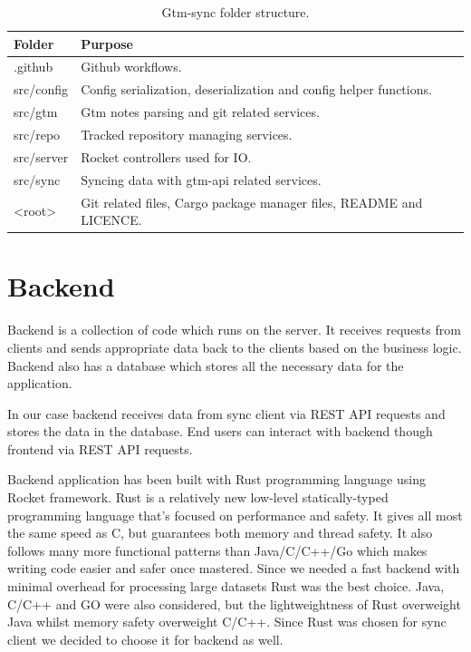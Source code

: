 \begin{table}[h]
    \centering
    \begin{tabular}{ | p{3cm} | p{10cm} |}
        \hline
        Folder & Purpose\\
        \hline
        .github & Github workflows.\\
        \hline
        src/config & Config serialization, deserialization and config helper functions.\\
        \hline
        src/gtm & Gtm notes parsing and git related services.\\
        \hline
        src/repo & Tracked repository managing services.\\
        \hline
        src/server & Rocket controllers used for IO.\\
        \hline
        src/sync & Syncing data with gtm-api related services.\\
        \hline
        <root> & Git related files, Cargo package manager files, README and LICENCE.\\
        \hline
    \end{tabular}
    \caption{Gtm-sync folder structure.}
    \label{tab:gtm-sync-folder-structure}
\end{table}

\section{Backend}\label{sec:backend}
Backend is a collection of code which runs on the server.
It receives requests from clients and sends appropriate data back to the clients based on the business logic.
Backend also has a database which stores all the necessary data for the application.

In our case backend receives data from sync client via REST API requests and stores the data in the database.
End users can interact with backend though frontend via REST API requests.

Backend application has been built with Rust programming language using Rocket framework.
Rust is a relatively new low-level statically-typed programming language that's focused on performance and safety.
It gives all most the same speed as C, but guarantees both memory and thread safety.
It also follows many more functional patterns than Java/C/C++/Go which makes writing code easier and safer once mastered.
Since we needed a fast backend with minimal overhead for processing large datasets Rust was the best choice.
Java, C/C++ and GO were also considered, but the lightweightness of Rust overweight Java whilst memory safety overweight C/C++.
Since Rust was chosen for sync client we decided to choose it for backend as well.

